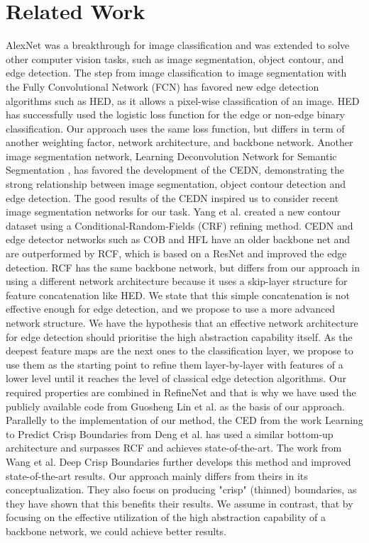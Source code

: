 \documentclass[runningheads]{llncs}
\begin{document}
\section{Related Work}

AlexNet \cite{AlexNet} was a breakthrough for image classification and was extended to solve other computer vision tasks, such as image segmentation, object contour, and edge detection. The step from image classification to image segmentation with the Fully Convolutional Network (FCN) \cite{FCN} has favored new edge detection algorithms such as HED, as it allows a pixel-wise classification of an image. HED has successfully used the logistic loss function for the edge or non-edge binary classification. Our approach uses the same loss function, but differs in term of another weighting factor, network architecture, and backbone network. Another image segmentation network, Learning Deconvolution Network for Semantic Segmentation \cite{Deconv}, has favored the development of the CEDN, demonstrating the strong relationship between image segmentation, object contour detection and edge detection. The good results of the CEDN inspired us to consider recent image segmentation networks for our task. Yang et al. created a new contour dataset using a Conditional-Random-Fields (CRF) \cite{CRF} refining method. CEDN and edge detector networks such as COB and HFL have an older backbone net and are outperformed by RCF, which is based on a ResNet and improved the edge detection. RCF has the same backbone network, but differs from our approach in using a different network architecture because it uses a skip-layer structure for feature concatenation like HED. We state that this simple concatenation is not effective enough for edge detection, and we propose to use a more advanced network structure. We have the hypothesis that an effective network architecture for edge detection should prioritise the high abstraction capability itself. As the deepest feature maps are the next ones to the classification layer, we propose to use them as the starting point to refine them layer-by-layer with features of a lower level until it reaches the level of classical edge detection algorithms. Our required properties are combined in RefineNet \cite{RefineNet} and that is why we have used the publicly available code from Guosheng Lin et al. as the basis of our approach. Parallelly to the implementation of our method, the CED from the work Learning to Predict Crisp Boundaries from Deng et al. \cite{LearnPCrispBound} has used a similar bottom-up architecture and surpasses RCF and achieves state-of-the-art. The work from Wang et al. Deep Crisp Boundaries \cite{CED} further develops this method and improved state-of-the-art results. Our approach mainly differs from theirs in its conceptualization. They also focus on producing "crisp" (thinned) boundaries, as they have shown that this benefits their results. We assume in contrast, that by focusing on the effective utilization of the high abstraction capability of a backbone network, we could achieve better results.
\end{document}
